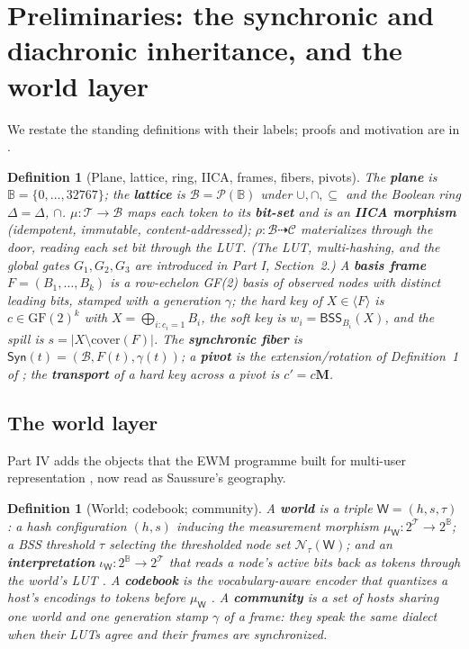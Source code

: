 \documentclass[11pt,a4paper]{article}
\newtheorem{definition}[principle]{Definition}
\theoremstyle{remark}
\newcommand{\Plane}{\ensuremath{\mathbb{B}}}            %
\newcommand{\Lat}{\ensuremath{\mathcal{B}}}              %
\newcommand{\Tok}{\ensuremath{\mathcal{T}}}              %
\newcommand{\xor}{\ensuremath{\Delta}}                   %
\newcommand{\BSS}{\ensuremath{\mathsf{BSS}}}             %
\newcommand{\spanof}[1]{\ensuremath{\langle #1\rangle}}  %
\newcommand{\Ctx}{\ensuremath{\mathcal{C}}}              %
\newcommand{\Ing}{\ensuremath{\mu}}                      %
\newcommand{\Mat}{\ensuremath{\rho}}                     %
\newcommand{\Sync}{\ensuremath{\mathsf{Syn}}}            %
\newcommand{\Gen}{\ensuremath{\gamma}}                   %
\newcommand{\cover}{\ensuremath{\mathrm{cover}}}         %
\newcommand{\Change}{\ensuremath{\mathbf{M}}}            %
\newcommand{\World}{\ensuremath{\mathsf{W}}}             %
\newcommand{\Iota}{\ensuremath{\iota}}                   %
\begin{document}
\section{Preliminaries: the synchronic and diachronic inheritance, and the world layer}
\label{sec:prelim}

We restate the standing definitions with their labels; proofs and motivation
are in \cite{part1,part2,part3}.

\begin{definition}[Plane, lattice, ring, IICA, frames, fibers, pivots]
\label{def:standing}
The \textbf{plane} is $\Plane=\{0,\dots,32767\}$; the \textbf{lattice} is
$\Lat=\mathcal{P}(\Plane)$ under $\cup,\cap,\subseteq$ and the Boolean ring
$\xor=\Delta$, $\cap$. $\Ing:\Tok\to\Lat$ maps each token to its
\textbf{bit-set} and is an \textbf{IICA morphism}
(idempotent, immutable, content-addressed); $\Mat:\Lat\dashrightarrow\Ctx$
materializes through the door, reading each set bit through the LUT. (The
LUT, multi-hashing, and the global gates $G_1,G_2,G_3$ are introduced in
Part I, Section~2.) A
\textbf{basis frame} $F=(B_1,\dots,B_k)$ is
a row-echelon GF(2) basis of observed nodes with distinct leading bits,
stamped with a generation $\Gen$; the hard key of $X\in\spanof{F}$ is
$c\in\mathrm{GF}(2)^k$ with $X=\bigoplus_{i:c_i=1}B_i$, the soft key is
$w_i=\BSS_{B_i}(X)$, and the spill is $s=|X\setminus\cover(F)|$. The
\textbf{synchronic fiber} is $\Sync(t)=(\Lat,F(t),\Gen(t))$; a
\textbf{pivot} is the extension/rotation of Definition~1 of \cite{part3};
the \textbf{transport} of a hard key across a pivot is $c' = c\Change$.
\end{definition}

\subsection{The world layer}

Part IV adds the objects that the EWM programme built for multi-user
representation \cite{companion2026,langue2026}, now read as Saussure's
geography.

\begin{definition}[World; codebook; community]
\label{def:world}
A \textbf{world} is a triple $\World = (h, s, \tau)$: a hash configuration
$(h,s)$ inducing the measurement morphism $\Ing_\World : 2^\Tok \to 2^\Plane$;
a BSS threshold $\tau$ selecting the thresholded node set
$\mathcal{N}_\tau(\World)$; and an \textbf{interpretation}
$\Iota_\World : 2^\Plane \to 2^\Tok$ that reads a node's active bits back as
tokens through the world's LUT \cite{companion2026}. A \textbf{codebook} is
the vocabulary-aware encoder that quantizes a host's encodings to tokens
before $\Ing_\World$ \cite{state2026}. A \textbf{community} is a set of hosts
sharing one world and one generation stamp $\Gen$ of a frame: they speak the
same dialect when their LUTs agree and their frames are synchronized.
\end{definition}
\end{document}
